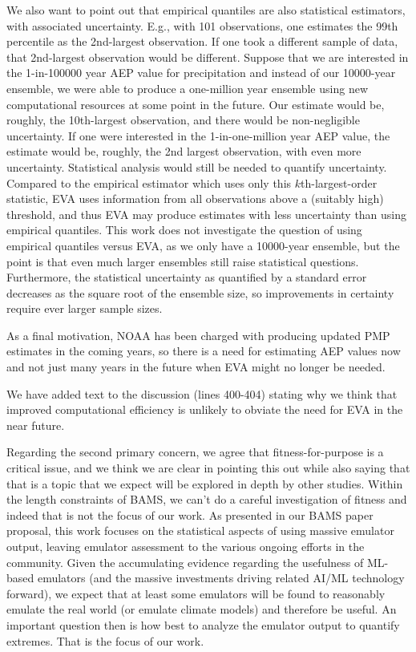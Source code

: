 \documentclass[12pt,english]{reviewresponse}
\begin{document}
\begin{revresponse}
We also want to point out that empirical quantiles are also statistical estimators, with associated uncertainty. E.g., with 101 observations, one estimates the 99th percentile as the 2nd-largest observation. If one took a different sample of data, that 2nd-largest observation would be different. Suppose that we are interested in the 1-in-100000 year AEP value for precipitation and instead of our 10000-year ensemble, we were able to produce a one-million year ensemble using new computational resources at some point in the future. Our estimate would be, roughly, the 10th-largest observation, and there would be non-negligible uncertainty. If one were interested in the 1-in-one-million year AEP value, the estimate would be, roughly, the 2nd largest observation, with even more uncertainty. Statistical analysis would still be needed to quantify uncertainty.
Compared to the empirical estimator which uses only this $k$th-largest-order statistic, EVA uses information from all observations above a (suitably high) threshold, and thus EVA may produce estimates with less uncertainty than using empirical quantiles. 
This work does not investigate the question of using empirical quantiles versus EVA, as we only have a 10000-year ensemble, but the point is that even much larger ensembles still raise statistical questions. Furthermore, the statistical uncertainty as quantified by a standard error decreases as the square root of the ensemble size, so improvements in certainty require ever larger sample sizes.


As a final motivation, NOAA has been charged with producing updated PMP estimates in the coming years, so there is a need for estimating AEP values now and not just many years in the future when EVA might no longer be needed. 

We have added text to the discussion (lines 400-404) stating why we think that improved computational efficiency is unlikely to obviate the need for EVA in the near future.

Regarding the second primary concern, we agree that fitness-for-purpose is a critical issue, and we think we are clear in pointing this out while also saying that that is a topic that we expect will be explored in depth by other studies. Within the length constraints of BAMS, we can't do a careful investigation of fitness and indeed that is not the focus of our work. As presented in our BAMS paper proposal, this work focuses on the statistical aspects of using massive emulator output, leaving emulator assessment to the various ongoing efforts in the community. Given the accumulating evidence regarding the usefulness of ML-based emulators (and the massive investments driving related AI/ML technology forward), we expect that at least some emulators will be found to reasonably emulate the real world (or emulate climate models) and therefore be useful. An important question then is how best to analyze the emulator output to quantify extremes. That is the focus of our work. 


\end{revresponse}
\end{document}
